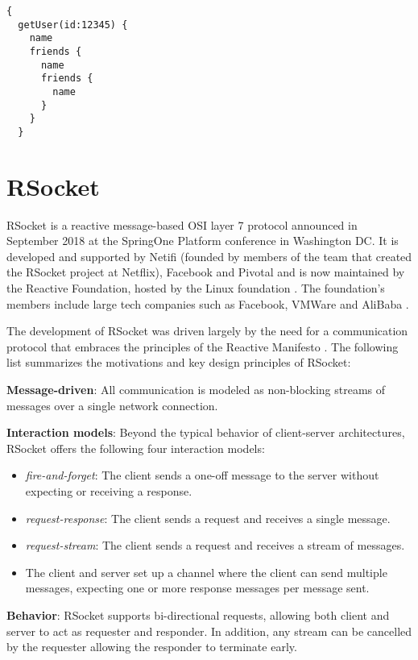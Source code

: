 \begin{lstlisting}[caption={An example GraphQL query}, captionpos=b,label={lst:query}]
{
  getUser(id:12345) {
    name
    friends {
      name
      friends {
        name
      }
    }
  }
\end{lstlisting}

\section{RSocket}
RSocket is a reactive message-based OSI layer 7 protocol announced in September 2018 at the SpringOne Platform conference in Washington DC. It is developed and supported by Netifi (founded by members of the team that created the RSocket project at Netflix), Facebook and Pivotal \cite{netifi2017rsocket} and is now maintained by the Reactive Foundation, hosted by the Linux foundation \cite{melanson2019rsockethome}. The foundation's members include large tech companies such as Facebook, VMWare and AliBaba \cite{reactivemembers}. 

The development of RSocket was driven largely by the need for a communication protocol that embraces the principles of the Reactive Manifesto \cite{rsocketmotivations}.  The following list summarizes the motivations and key design principles of RSocket:

\textbf{Message-driven}: All communication is modeled as non-blocking streams of messages over a single network connection.

\textbf{Interaction models}: Beyond the typical behavior of client-server architectures, RSocket offers the following four interaction models:
    \begin{itemize}
        \item \textit{fire-and-forget}: The client sends a one-off message to the server without expecting or receiving a response.
        \item \textit{request-response}: The client sends a request and receives a single message.
        \item \textit{request-stream}: The client sends a request and receives a stream of messages.
        \item The client and server set up a channel where the client can send multiple messages, expecting one or more response messages per message sent.
    \end{itemize}

\textbf{Behavior}: RSocket supports bi-directional requests, allowing both client and server to act as requester and responder. In addition, any stream can be cancelled by the requester allowing the responder to terminate early.

